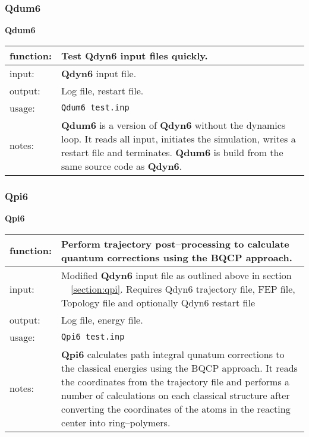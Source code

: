 \documentclass[a4paper,11pt]{article}
\let\origref\ref
\def\ref#1{\unskip~\origref{#1}}
\begin{document}
\subsubsection{\textbf{Qdum6}}\label{subsubsec:qdum}

\textbf{Qdum6}\\
\begin{tabularx}{\textwidth}{|l|X|}
\hline
 function: &   Test \textbf{Qdyn6} input files quickly.\\\hline
 input:    &   \textbf{Qdyn6} input file.\\\hline
 output:   &   Log file, restart file.\\\hline
 usage:    &   \verb"Qdum6 test.inp"\\\hline
 notes:    &   \textbf{Qdum6} is a version of \textbf{Qdyn6} without the dynamics loop. It reads all input, initiates the
	       simulation, writes a restart file and terminates. \textbf{Qdum6} is build from the same source
               code as \textbf{Qdyn6}.\\
\hline
\end{tabularx}

\subsubsection{\textbf{Qpi6}}\label{subsubsec:qpi}

\textbf{Qpi6}\\
\begin{tabularx}{\textwidth}{|l|X|}
\hline
 function: &   Perform trajectory post--processing to calculate quantum corrections using the BQCP approach.\\\hline
 input:    &   Modified \textbf{Qdyn6} input file as outlined above in section \ref{section:qpi}. Requires Qdyn6 trajectory file, FEP file, Topology file and optionally Qdyn6 restart file\\\hline
 output:   &   Log file, energy file.\\\hline
 usage:    &   \verb"Qpi6 test.inp"\\\hline
 notes:    &   \textbf{Qpi6} calculates path integral qunatum corrections to the classical energies using the BQCP approach. It reads the coordinates from the trajectory file and performs a number of calculations on each classical structure after converting the coordinates of the atoms in the reacting center into ring--polymers.\\
\hline
\end{tabularx}

\newpage
\printbibliography
\end{document}
